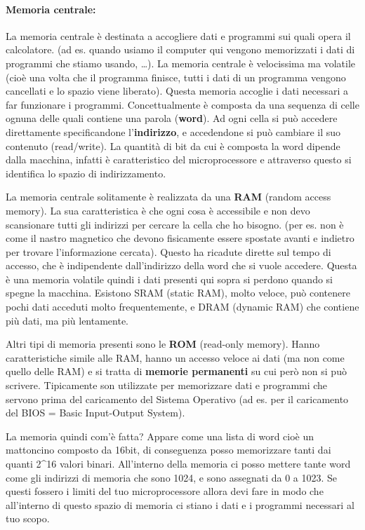 \documentclass[
  paper=a4,
  oneside  ,captions=tableheading
]{scrbook}
\begin{document}
\hypertarget{memoria-centrale}{%
\paragraph{Memoria centrale:}\label{memoria-centrale}}

La memoria centrale è destinata a accogliere dati e programmi sui quali
opera il calcolatore. (ad es. quando usiamo il computer qui vengono
memorizzati i dati di programmi che stiamo usando, \ldots). La memoria
centrale è velocissima ma volatile (cioè una volta che il programma
finisce, tutti i dati di un programma vengono cancellati e lo spazio
viene liberato). Questa memoria accoglie i dati necessari a far
funzionare i programmi. Concettualmente è composta da una sequenza di
celle ognuna delle quali contiene una parola (\textbf{word}). Ad ogni
cella si può accedere direttamente specificandone l'\textbf{indirizzo},
e accedendone si può cambiare il suo contenuto (read/write). La quantità
di bit da cui è composta la word dipende dalla macchina, infatti è
caratteristico del microprocessore e attraverso questo si identifica lo
spazio di indirizzamento.

La memoria centrale solitamente è realizzata da una \textbf{RAM} (random
access memory). La sua caratteristica è che ogni cosa è accessibile e
non devo scansionare tutti gli indirizzi per cercare la cella che ho
bisogno. (per es. non è come il nastro magnetico che devono fisicamente
essere spostate avanti e indietro per trovare l'informazione cercata).
Questo ha ricadute dirette sul tempo di accesso, che è indipendente
dall'indirizzo della word che si vuole accedere. Questa è una memoria
volatile quindi i dati presenti qui sopra si perdono quando si spegne la
macchina. Esistono SRAM (static RAM), molto veloce, può contenere pochi
dati acceduti molto frequentemente, e DRAM (dynamic RAM) che contiene
più dati, ma più lentamente.

Altri tipi di memoria presenti sono le \textbf{ROM} (read-only memory).
Hanno caratteristiche simile alle RAM, hanno un accesso veloce ai dati
(ma non come quello delle RAM) e si tratta di \textbf{memorie
permanenti} su cui però non si può scrivere. Tipicamente son utilizzate
per memorizzare dati e programmi che servono prima del caricamento del
Sistema Operativo (ad es. per il caricamento del BIOS = Basic
Input-Output System).

La memoria quindi com'è fatta? Appare come una lista di word cioè un
mattoncino composto da 16bit, di conseguenza posso memorizzare tanti dai
quanti 2\^{}16 valori binari. All'interno della memoria ci posso mettere
tante word come gli indirizzi di memoria che sono 1024, e sono assegnati
da 0 a 1023. Se questi fossero i limiti del tuo microprocessore allora
devi fare in modo che all'interno di questo spazio di memoria ci stiano
i dati e i programmi necessari al tuo scopo.
\end{document}
